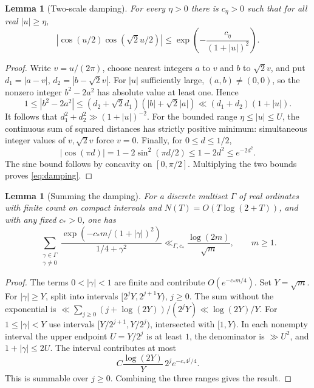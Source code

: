 \documentclass[11pt]{article}
\newtheorem{lemma}[theorem]{Lemma}
\theoremstyle{remark}\newtheorem{remark}[theorem]{Remark}
\begin{document}
\begin{lemma}[Two-scale damping]\label{lem:cos}
For every $\eta>0$ there is $c_\eta>0$ such that for all real $|u|\ge\eta$,
\begin{equation}\label{eq:damping}
 |\cos(u/2)\cos(\sqrt2 u/2)|\le
 \exp\left(-\frac{c_\eta}{(1+|u|)^2}\right).
\end{equation}
\end{lemma}
\begin{proof}
Write $v=u/(2\pi)$, choose nearest integers $a$ to $v$ and $b$ to $\sqrt2v$, and put $d_1=|a-v|$, $d_2=|b-\sqrt2v|$. For $|u|$ sufficiently large, $(a,b)\ne(0,0)$, so the nonzero integer $b^2-2a^2$ has absolute value at least one. Hence
\[
 1\le|b^2-2a^2|\le (d_2+\sqrt2d_1)(|b|+\sqrt2|a|)
       \ll (d_1+d_2)(1+|u|).
\]
It follows that $d_1^2+d_2^2\gg(1+|u|)^{-2}$. For the bounded range $\eta\le|u|\le U$, the continuous sum of squared distances has strictly positive minimum: simultaneous integer values of $v,\sqrt2v$ force $v=0$. Finally, for $0\le d\le1/2$,
\[
 |\cos(\pi d)|=1-2\sin^2(\pi d/2)\le1-2d^2\le e^{-2d^2}.
\]
The sine bound follows by concavity on $[0,\pi/2]$. Multiplying the two bounds proves \eqref{eq:damping}.
\end{proof}

\begin{lemma}[Summing the damping]\label{lem:sum}
For a discrete multiset $\Gamma$ of real ordinates with finite count on compact intervals and $N(T)=O(T\log(2+T))$, and with any fixed $c_*>0$, one has
\[
 \sum_{\substack{\gamma\in\Gamma\\\gamma\ne0}}
 \frac{\exp(-c_*m/(1+|\gamma|)^2)}{1/4+\gamma^2}
 \ll_{\Gamma,c_*}\frac{\log(2m)}{\sqrt m},\qquad m\ge1.
\]
\end{lemma}
\begin{proof}
The terms $0<|\gamma|<1$ are finite and contribute $O(e^{-c_*m/4})$. Set $Y=\sqrt m$. For $|\gamma|\ge Y$, split into intervals $[2^jY,2^{j+1}Y)$, $j\ge0$. The sum without the exponential is $\ll\sum_{j\ge0}(j+\log(2Y))/(2^jY)\ll\log(2Y)/Y$. For $1\le|\gamma|<Y$ use intervals $[Y/2^{j+1},Y/2^j)$, intersected with $[1,Y)$. In each nonempty interval the upper endpoint $U=Y/2^j$ is at least $1$, the denominator is $\gg U^2$, and $1+|\gamma|\le2U$. The interval contributes at most
\[
 C\frac{\log(2Y)}Y\,2^j e^{-c_*4^j/4}.
\]
This is summable over $j\ge0$. Combining the three ranges gives the result.
\end{proof}
\end{document}
